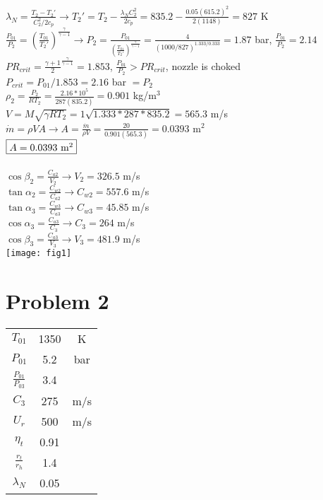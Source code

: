 \documentclass{article}
\begin{document}
$\lambda_N=\frac{T_2-T_2'}{C_2^2/2c_p} \rightarrow T_2'=T_2-\frac{\lambda_NC_2^2}{2c_p}=
835.2-\frac{0.05(615.2)^2}{2(1148)}=827$ K \\
$\frac{P_{01}}{P_{2}}=(\frac{T_{01}}{T_2'})^\frac{\gamma}{\gamma-1}
\rightarrow P_2=\frac{P_{01}}{(\frac{T_{01}}{T_2'})^\frac{\gamma}{\gamma-1}}=
\frac{4}{(1000/827)^{1.333/0.333}}=1.87$ bar, \quad $\frac{P_{01}}{P_2}=2.14$ \\
$PR_{crit}=\frac{\gamma+1}{2}^\frac{\gamma}{\gamma-1}=1.853$, \quad $\frac{P_{01}}{P_2}>PR_{crit}$,
\quad nozzle is choked \\
$P_{crit}=P_{01}/1.853=2.16$ bar $=P_2$ \\
$\rho_2=\frac{P_2}{RT_2}=\frac{2.16*10^5}{287(835.2)}=0.901$ kg/m$^3$ \\
$V=M\sqrt{\gamma RT_2}=1\sqrt{1.333*287*835.2}=565.3$ m/s \\
$\dot{m}=\rho VA \rightarrow A=\frac{\dot{m}}{\rho V}=\frac{20}{0.901(565.3)}=0.0393$ m$^2$ \\
$\fbox{$A=0.0393$ m$^2$}$ \\\\
$\cos\beta_2=\frac{C_{a2}}{V_2} \rightarrow V_2=326.5$ m/s \\
$\tan\alpha_2=\frac{C_{w2}}{C_{a2}} \rightarrow C_{w2}=557.6$ m/s \\
$\tan\alpha_3=\frac{C_{w3}}{C_{a3}} \rightarrow C_{w3}=45.85$ m/s \\
$\cos\alpha_3=\frac{C_{a3}}{C_3} \rightarrow C_3=264$ m/s \\
$\cos\beta_3=\frac{C_{a3}}{V_3} \rightarrow V_3=481.9$ m/s \\
\texttt{[image: fig1]}

\section*{Problem 2}
\begin{tabular}{ccc}
    $T_{01}$ & 1350 & K \\
    $P_{01}$ & 5.2 & bar \\
    $\frac{P_{01}}{P_{03}}$ & 3.4 \\
    $C_3$ & 275 & m/s \\
    $U_r$ & 500 & m/s \\
    $\eta_t$ & 0.91 \\
    $\frac{r_t}{r_h}$ & 1.4 \\
    $\lambda_N$ & 0.05
\end{tabular}
\end{document}
